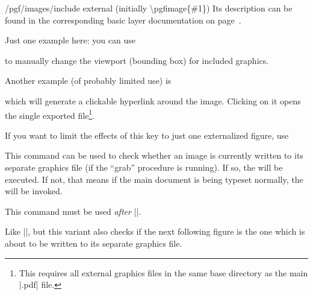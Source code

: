 {\begin{key}{/pgf/images/include external (initially \textbackslash pgfimage\{\#1\})}
	Its description can be found in the corresponding basic layer documentation on page~\pageref{pgf:includeexternalkey}.

	Just one example here: you can use
\begin{codeexample}
\end{codeexample}
	to manually change the viewport (bounding box) for included graphics.

	Another example (of probably limited use) is
\begin{codeexample}
\end{codeexample}
	\noindent which will generate a clickable hyperlink around the image. Clicking on it opens the single exported file\footnote{This requires all external graphics files in the same base directory as the main |.pdf| file.}.
	
	If you want to limit the effects of this key to just one externalized figure, use
\begin{codeexample}
{
}%
\end{codeexample}
\end{key}

\begin{command}{\tikzifexternalizing{}}
	This command can be used to check whether an image is currently written to its separate graphics file (if the ``grab'' procedure is running). If so, the  will be executed. If not, that means if the main document is being typeset normally, the  will be invoked.

	This command must be used \emph{after} |\tikzexternalize|.
\end{command}

\begin{command}{\tikzifexternalizingnext{}}
	Like |\tikzifexternalizing|, but this variant also checks if the next following figure is the one which is about to be written to its separate graphics file.
\end{command}

}
